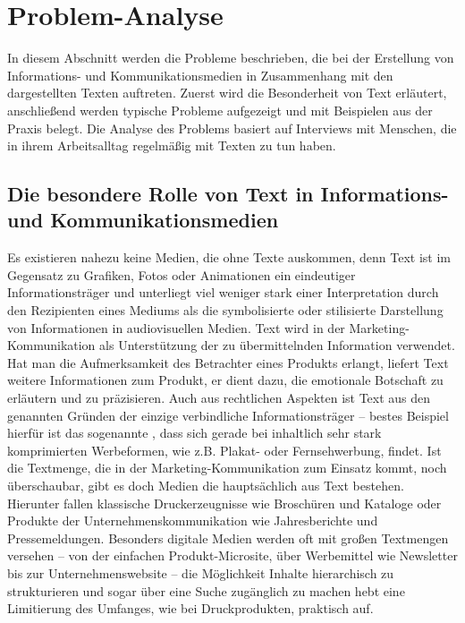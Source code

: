 \section{Problem-Analyse}

In diesem Abschnitt werden die Probleme beschrieben, die bei der Erstellung von Informations- und Kommunikationsmedien in Zusammenhang mit den dargestellten Texten auftreten. Zuerst wird die Besonderheit von Text erläutert, anschließend werden typische Probleme aufgezeigt und mit Beispielen aus der Praxis belegt. Die Analyse des Problems basiert auf Interviews mit Menschen, die in ihrem Arbeitsalltag regelmäßig mit Texten zu tun haben.

\subsection{Die besondere Rolle von Text in Informations- und Kommunikationsmedien}

Es existieren nahezu keine Medien, die ohne Texte auskommen, denn Text ist im Gegensatz zu Grafiken, Fotos oder Animationen ein eindeutiger Informationsträger und unterliegt viel weniger stark einer Interpretation durch den Rezipienten eines Mediums als die symbolisierte oder stilisierte Darstellung von Informationen in audiovisuellen Medien. Text wird in der Marketing-Kommunikation als Unterstützung der zu übermittelnden Information verwendet. Hat man die Aufmerksamkeit des Betrachter eines Produkts erlangt, liefert Text weitere Informationen zum Produkt, er dient dazu, die emotionale Botschaft zu erläutern und zu präzisieren. Auch aus rechtlichen Aspekten ist Text aus den genannten Gründen der einzige verbindliche Informationsträger -- bestes Beispiel hierfür ist das sogenannte , dass sich gerade bei inhaltlich sehr stark komprimierten Werbeformen, wie z.B. Plakat- oder Fernsehwerbung, findet. Ist die Textmenge, die in der Marketing-Kommunikation zum Einsatz kommt, noch überschaubar, gibt es doch Medien die hauptsächlich aus Text bestehen. Hierunter fallen klassische Druckerzeugnisse wie Broschüren und Kataloge oder Produkte der Unternehmenskommunikation wie Jahresberichte und Pressemeldungen. Besonders digitale Medien werden oft mit großen Textmengen versehen -- von der einfachen Produkt-Microsite, über Werbemittel wie Newsletter bis zur Unternehmenswebsite -- die Möglichkeit Inhalte hierarchisch zu strukturieren und sogar über eine Suche zugänglich zu machen hebt eine Limitierung des Umfanges, wie bei Druckprodukten, praktisch auf.

